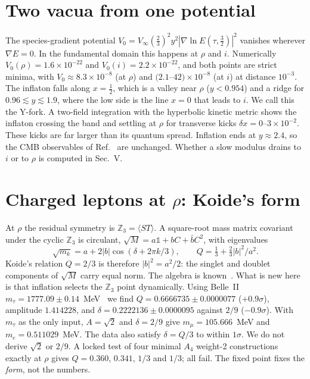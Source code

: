 \documentclass[aps,prd,twocolumn,superscriptaddress,nofootinbib,showkeys]{revtex4-2}
\begin{document}
\section{Two vacua from one potential}
The species-gradient potential $V_0=V_\infty(\tfrac23)^2y^2|\nabla\ln E(\tau,\tfrac32)|^2$ vanishes wherever $\nabla E=0$. In the fundamental domain this happens at $\rho$ and $i$. Numerically $V_0(\rho)=1.6\times10^{-22}$ and $V_0(i)=2.2\times10^{-22}$, and both points are strict minima, with $V_0\approx8.3\times10^{-8}$ (at $\rho$) and $(2.1$--$42)\times10^{-8}$ (at $i$) at distance $10^{-3}$. The inflaton falls along $x=\tfrac12$, which is a valley near $\rho$ ($y<0.954$) and a ridge for $0.96\lesssim y\lesssim1.9$, where the low side is the line $x=0$ that leads to $i$. We call this the Y-fork. A two-field integration with the hyperbolic kinetic metric shows the inflaton crossing the band and settling at $\rho$ for transverse kicks $\delta x=0$--$3\times10^{-2}$. These kicks are far larger than its quantum spread. Inflation ends at $y\approx2.4$, so the CMB observables of Ref.~\cite{P1} are unchanged. Whether a slow modulus drains to $i$ or to $\rho$ is computed in Sec.~V.

\section{Charged leptons at $\rho$: Koide's form}
At $\rho$ the residual symmetry is $\mathbb Z_3=\langle ST\rangle$. A square-root mass matrix covariant under the cyclic $\mathbb Z_3$ is circulant, $\sqrt M=a\mathbb 1+bC+\bar bC^2$, with eigenvalues
\begin{equation}
\sqrt{m_k}=a+2|b|\cos(\delta+2\pi k/3),\qquad Q=\tfrac13+\tfrac23|b|^2/a^2 .
\end{equation}
Koide's relation $Q=2/3$ is therefore $|b|^2=a^2/2$: the singlet and doublet components of $\sqrt M$ carry equal norm. The algebra is known~\cite{Foot}. What is new here is that inflation selects the $\mathbb Z_3$ point dynamically. Using Belle~II $m_\tau=1777.09\pm0.14$~MeV~\cite{Belle} we find $Q=0.6666735\pm0.0000077$ ($+0.9\sigma$), amplitude $1.414228$, and $\delta=0.2222136\pm0.0000095$ against $2/9$ ($-0.9\sigma$). With $m_\tau$ as the only input, $A=\sqrt2$ and $\delta=2/9$ give $m_\mu=105.666$~MeV and $m_e=0.511029$~MeV. The data also satisfy $\delta=Q/3$ to within $1\sigma$. We do not derive $\sqrt2$ or $2/9$. A locked test of four minimal $A_4$ weight-2 constructions exactly at $\rho$ gives $Q=0.360$, $0.341$, $1/3$ and $1/3$; all fail. The fixed point fixes the \emph{form}, not the numbers.
\end{document}
